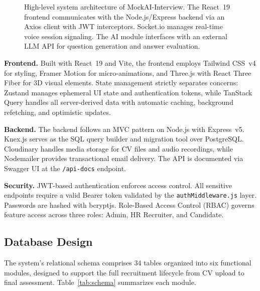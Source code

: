 \documentclass[pdflatex,sn-mathphys-num]{sn-jnl}%
\theoremstyle{thmstyleone}%
\theoremstyle{thmstyletwo}%
\theoremstyle{thmstylethree}%
\begin{document}
\begin{figure}[h]
\centering
\caption{High-level system architecture of MockAI-Interview. The React~19 frontend communicates with the Node.js/Express backend via an Axios client with JWT interceptors. Socket.io manages real-time voice session signaling. The AI module interfaces with an external LLM API for question generation and answer evaluation.}\label{fig:architecture}
\end{figure}

\textbf{Frontend.} Built with React~19 and Vite, the frontend employs Tailwind CSS~v4 for styling, Framer Motion for micro-animations, and Three.js with React Three Fiber for 3D visual elements. State management strictly separates concerns: Zustand manages ephemeral UI state and authentication tokens, while TanStack Query handles all server-derived data with automatic caching, background refetching, and optimistic updates.

\textbf{Backend.} The backend follows an MVC pattern on Node.js with Express~v5. Knex.js serves as the SQL query builder and migration tool over PostgreSQL. Cloudinary handles media storage for CV files and audio recordings, while Nodemailer provides transactional email delivery. The API is documented via Swagger UI at the \texttt{/api-docs} endpoint.

\textbf{Security.} JWT-based authentication enforces access control. All sensitive endpoints require a valid Bearer token validated by the \texttt{authMiddleware.js} layer. Passwords are hashed with bcryptjs. Role-Based Access Control (RBAC) governs feature access across three roles: Admin, HR Recruiter, and Candidate.

\subsection{Database Design}\label{subsec4-2}

The system's relational schema comprises 34 tables organized into six functional modules, designed to support the full recruitment lifecycle from CV upload to final assessment. Table~\ref{tab:schema} summarizes each module.
\end{document}
